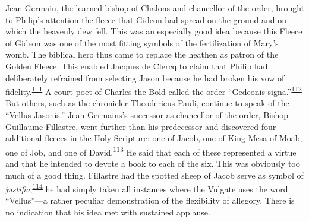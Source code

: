 Jean Germain, the learned bishop of Chalons and chancellor of the order,
brought to Philip's attention the fleece that Gideon had spread on the
ground and on which the heavenly dew fell. This was an especially good
idea because this Fleece of Gideon was one
\protect\hypertarget{10_Chapter_Three__THE_HEROIC_DREAM.xhtmlux5cux23page_96}{}{}of
the most fitting symbols of the fertilization of Mary's womb. The
biblical hero thus came to replace the heathen as patron of the Golden
Fleece. This enabled Jacques de Clercq to claim that Philip had
deliberately refrained from selecting Jason because he had broken his
vow of
fidelity.\textsuperscript{\protect\hypertarget{10_Chapter_Three__THE_HEROIC_DREAM.xhtmlux5cux23id_1713}{\protect\hyperlink{23_NOTES.xhtmlux5cux23id_1714}{111}}}
A court poet of Charles the Bold called the order ``Gedeonis
signa.''\textsuperscript{\protect\hypertarget{10_Chapter_Three__THE_HEROIC_DREAM.xhtmlux5cux23id_1711}{\protect\hyperlink{23_NOTES.xhtmlux5cux23id_1712}{112}}}
But others, such as the chronicler Theodericus Pauli, continue to speak
of the ``Vellus Jasonis.'' Jean Germains's successor as chancellor of
the order, Bishop Guillaume Fillastre, went further than his predecessor
and discovered four additional fleeces in the Holy Scripture: one of
Jacob, one of King Mesa of Moab, one of Job, and one of
David.\textsuperscript{\protect\hypertarget{10_Chapter_Three__THE_HEROIC_DREAM.xhtmlux5cux23id_1709}{\protect\hyperlink{23_NOTES.xhtmlux5cux23id_1710}{113}}}
He said that each of these represented a virtue and that he intended to
devote a book to each of the six. This was obviously too much of a good
thing. Fillastre had the spotted sheep of Jacob serve as symbol of
\emph{justifia};\textsuperscript{\protect\hypertarget{10_Chapter_Three__THE_HEROIC_DREAM.xhtmlux5cux23id_1707}{\protect\hyperlink{23_NOTES.xhtmlux5cux23id_1708}{114}}}
he had simply taken all instances where the Vulgate uses the word
``Vellus''---a rather peculiar demonstration of the flexibility of
allegory. There is no indication that his idea met with sustained
applause.

